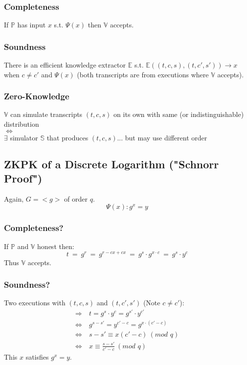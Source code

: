\documentclass{report}
\begin{document}
			\subsubsection{Completeness}
			\startsubsection
				If $\mathbb{P}$ has input $x$ s.t. $\Psi (x)$ then $\mathbb{V}$ accepts.
			\closesection
			\subsubsection{Soundness}
			\startsubsection
				There is an efficient knowledge extractor $\mathbb{E}$ s.t. $\mathbb{E}((t,c,s), (t,c',s')) \rightarrow x$ when $c \neq c'$ and $\Psi (x)$ (both transcripts are from executions where $\mathbb{V}$ accepts).
			\closesection
			\subsubsection{Zero-Knowledge}
			\startsubsection
				$\mathbb{V}$ can simulate transcripts $(t,c,s)$ on its own with same (or indistinguishable) distribution \\
				$\Leftrightarrow$ \\
				$\exists$ simulator $\mathbb{S}$ that produces $(t,c,s)$... but may use different order
			\closesection
		\closesection
		\subsection{ZKPK of a Discrete Logarithm ("Schnorr Proof")}
		\startsubsection
			Again, $G = <g>$ of order $q$.
			\[
				\Psi (x): g^x = y
			\]
			\begin{tikzpicture}
			\end{tikzpicture}
			\subsubsection{Completeness?}
			\startsubsection
				If $\mathbb{P}$ and $\mathbb{V}$ honest then:
				\[
					t \ = \ g^r \ = \ g^{r-cx+cx} \ = \ g^s \cdot g^{x \cdot c} \ = \ g^s \cdot y^c
				\]
				Thus $\mathbb{V}$ accepts.
			\closesection
			\subsubsection{Soundness?}
			\startsubsection
				Two executions with $(t,c,s)$ and $(t,c',s')$ (Note $c \neq c'$):
				\begin{align*}
					\Rightarrow & \ t = g^s \cdot y^c = g^{s'} \cdot y^{c'} \\
					\Leftrightarrow & \ g^{s-s'} = y^{c'-c} = g^{x \cdot (c' - c)} \\
					\Leftrightarrow & \ s - s' \equiv x (c' - c) \ (\textit{mod } q) \\
					\Leftrightarrow & \ x \equiv \frac{s-s'}{c'-c} \ (\textit{mod } q)
				\end{align*}
				This $x$ satisfies $g^x = y$.
			\closesection
\end{document}
